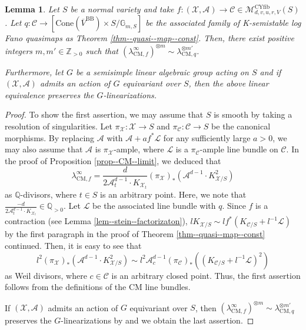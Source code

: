 \documentclass[12pt,twoside]{amsart}
\newtheorem{lem}[thm]{Lemma}
\theoremstyle{definition}
\begin{document}
\begin{lem}\label{lem--linear--equiv--two--CM}
    Let $S$ be a normal variety and take $f\colon (\mathcal{X},\mathcal{A})\to \mathcal{C}\in\mathcal{M}^{\mathrm{CYfib}}_{d,v,u,r,V}(S)$.
    Let $q\colon\mathcal{C}\to [\mathrm{Cone}(\overline{V}^{\mathrm{BB}})\times S/\mathbb{G}_{m,S}]$ be the associated family of K-semistable log Fano quasimaps as Theorem \ref{thm--quasi--map--const}.
Then, there exist positive integers $m,m'\in\mathbb{Z}_{>0}$ such that $(\lambda_{\mathrm{CM},f}^{\infty})^{\otimes m}\sim\lambda_{\mathrm{CM},q}^{\otimes m'}$.

Furthermore, let $G$ be a semisimple linear algebraic group acting on $S$ and if $(\mathcal{X},\mathcal{A})$ admits an action of $G$ equivariant over $S$, then the above linear equivalence preserves the $G$-linearizations.
\end{lem}

\begin{proof}
To show the first assertion, we may assume that $S$ is smooth by taking a resolution of singularities.
Let $\pi_{\mathcal{X}}\colon \mathcal{X}\to S$ and $\pi_{\mathcal{C}}\colon \mathcal{C}\to S$ be the canonical morphisms.
By replacing $\mathcal{A}$ with $\mathcal{A}+a f^*\mathcal{L}$ for any sufficiently large $a>0$, we may also assume that $\mathcal{A}$ is $\pi_{\mathcal{X}}$-ample, where $\mathcal{L}$ is a $\pi_{\mathcal{C}}$-ample line bundle on $\mathcal{C}$.
In the proof of Proposition \ref{prop--CM--limit}, we deduced that 
\[
\lambda_{\mathrm{CM},f}^{\infty}=\frac{d}{2\mathcal{A}_t^{d-1}\cdot K_{\mathcal{X}_t}}(\pi_{\mathcal{X}})_*\left(\mathcal{A}^{d-1}\cdot K_{\mathcal{X}/S}^2\right)
\]
as $\mathbb{Q}$-divisors, where $t\in S$ is an arbitrary point.
Here, we note that $\frac{-d}{2\mathcal{A}_t^{d-1}\cdot K_{\mathcal{X}_t}}\in\mathbb{Q}_{>0}$.
Let $\mathscr{L}$ be the associated line bundle with $q$.
Since $f$ is a contraction (see Lemma \ref{lem--stein--factorizaton}), $lK_{\mathcal{X}/S}\sim lf^*(K_{\mathcal{C}/S}+l^{-1}\mathscr{L})$ by the first paragraph in the proof of Theorem \ref{thm--quasi--map--const} continued. 
Then, it is easy to see that 
\begin{equation*}
l^2(\pi_{\mathcal{X}})_*\left(\mathcal{A}^{d-1}\cdot K_{\mathcal{X}/S}^2\right)\sim l^2\mathcal{A}^{d-1}_c(\pi_{\mathcal{C}})_*((K_{\mathcal{C}/S}+l^{-1}\mathscr{L})^2)\label{eq--linearlization}
\end{equation*}
as Weil divisors, where $c\in\mathcal{C}$ is an arbitrary closed point.
Thus, the first assertion follows from the definitions of the CM line bundles.

If $(\mathcal{X},\mathcal{A})$ admits an action of $G$ equivariant over $S$, then $(\lambda_{\mathrm{CM},f}^{\infty})^{\otimes m}\sim\lambda_{\mathrm{CM},q}^{\otimes m'}$ preserves the $G$-linearizations by \cite[Proposition 1.4]{GIT} and we obtain the last assertion.
\end{proof}
\end{document}
